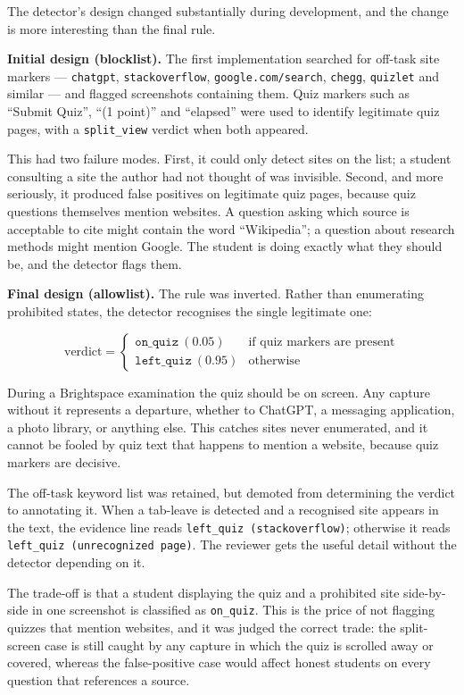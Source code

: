 \documentclass[12pt,oneside]{report}
\newcommand{\code}[1]{\texttt{\small #1}}
\begin{document}
The detector's design changed substantially during development, and the change
is more interesting than the final rule.

\textbf{Initial design (blocklist).} The first implementation searched for
off-task site markers --- \code{chatgpt}, \code{stackoverflow},
\code{google.com/search}, \code{chegg}, \code{quizlet} and similar --- and
flagged screenshots containing them. Quiz markers such as ``Submit Quiz'',
``(1 point)'' and ``elapsed'' were used to identify legitimate quiz pages, with
a \code{split\_view} verdict when both appeared.

This had two failure modes. First, it could only detect sites on the list; a
student consulting a site the author had not thought of was invisible. Second,
and more seriously, it produced false positives on legitimate quiz pages,
because quiz questions themselves mention websites. A question asking which
source is acceptable to cite might contain the word ``Wikipedia''; a question
about research methods might mention Google. The student is doing exactly what
they should be, and the detector flags them.

\textbf{Final design (allowlist).} The rule was inverted. Rather than
enumerating prohibited states, the detector recognises the single legitimate
one:

\[
\text{verdict} =
\begin{cases}
\texttt{on\_quiz}\ (0.05) & \text{if quiz markers are present} \\
\texttt{left\_quiz}\ (0.95) & \text{otherwise}
\end{cases}
\]

During a Brightspace examination the quiz should be on screen. Any capture
without it represents a departure, whether to ChatGPT, a messaging application,
a photo library, or anything else. This catches sites never enumerated, and it
cannot be fooled by quiz text that happens to mention a website, because quiz
markers are decisive.

The off-task keyword list was retained, but demoted from determining the
verdict to annotating it. When a tab-leave is detected and a recognised site
appears in the text, the evidence line reads \code{left\_quiz (stackoverflow)};
otherwise it reads \code{left\_quiz (unrecognized page)}. The reviewer gets the
useful detail without the detector depending on it.

The trade-off is that a student displaying the quiz and a prohibited site
side-by-side in one screenshot is classified as \code{on\_quiz}. This is the
price of not flagging quizzes that mention websites, and it was judged the
correct trade: the split-screen case is still caught by any capture in which
the quiz is scrolled away or covered, whereas the false-positive case would
affect honest students on every question that references a source.
\end{document}

